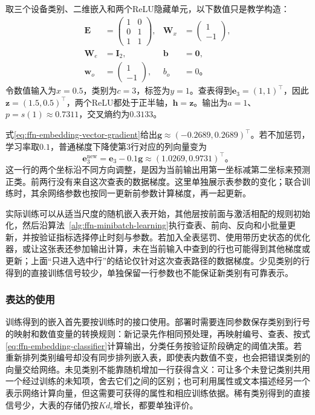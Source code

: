 \begin{example}[一次嵌入查表与更新]
  \label{ex:ffn-embedding-update}
  取三个设备类别、二维嵌入和两个ReLU隐藏单元，以下数值只是教学构造：
  \[
    \begin{aligned}
      \bm{E}&=\begin{pmatrix}1&0\\0&1\\1&1\end{pmatrix},
      &\bm{W}_x&=\begin{pmatrix}1\\-1\end{pmatrix},\\
      \bm{W}_e&=\bm{I}_2,
      &\bm{b}&=\bm{0},\\
      \bm{w}_o&=\begin{pmatrix}1\\-1\end{pmatrix},
      &b_o&=0\text{。}
    \end{aligned}
  \]
  令数值输入为$x=0.5$，类别为$c=3$，标签为$y=1$。查表得到$\bm{e}_3=(1,1)^{\top}$，因此$\bm{z}=(1.5,0.5)^{\top}$，两个ReLU都处于正半轴，$\bm{h}=\bm{z}$。输出为$a=1$、$p=s(1)\approx0.7311$，交叉熵约为$0.3133$。

  式\eqref{eq:ffn-embedding-vector-gradient}给出$\bm{g}\approx(-0.2689,0.2689)^{\top}$。若不加惩罚，学习率取$0.1$，普通梯度下降使第3行对应的列向量变为
  \[
    \bm{e}_3^{\mathrm{new}}
    =\bm{e}_3-0.1\bm{g}
    \approx(1.0269,0.9731)^{\top}\text{。}
  \]
  这一行的两个坐标沿不同方向调整，是因为当前输出用第一坐标减第二坐标来预测正类。前两行没有来自这次查表的数据梯度。这里单独展示表参数的变化；联合训练时，其余网络参数也按同一更新前参数计算梯度，再一起更新。
\end{example}

实际训练可以从适当尺度的随机嵌入表开始，其他层按前面与激活相配的规则初始化，然后沿算法~\ref{alg:ffn-minibatch-learning}执行查表、前向、反向和小批量更新，并按验证指标选择停止时刻与参数。若加入全表惩罚、使用带历史状态的优化器，或让这张表还参加输出计算，未在当前输入中查到的行也可能得到其他梯度或更新；上面“只进入选中行”的结论仅针对这次查表路径的数据梯度。少见类别的行得到的直接训练信号较少，单独保留一行参数也不能保证新类别有可靠表示。

\subsubsection{表达的使用}
\label{sec:ffn-embedding-use}

训练得到的嵌入首先要按训练时的接口使用。部署时需要连同参数保存类别到行号的映射和数值变量的转换规则：新记录先作相同预处理，再映射编号、查表、按式\eqref{eq:ffn-embedding-classifier}计算输出，分类任务按验证阶段确定的阈值决策。若重新排列类别编号却没有同步排列嵌入表，即使表内数值不变，也会把错误类别的向量交给网络。未见类别不能靠随机增加一行获得含义：可让多个未登记类别共用一个经过训练的未知项，舍去它们之间的区别；也可利用属性或文本描述经另一个表示网络计算向量，但这需要可获得的属性和相应训练依据。稀有类别得到的直接信号少，大表的存储仍按$Kd_e$增长，都要单独评价。

